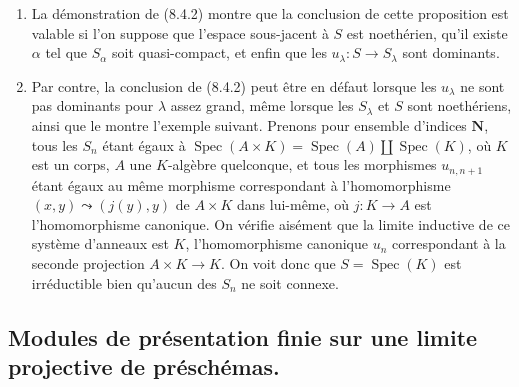 \begin{remarks}[8.4.6]
\label{IV.8.4.6-fr}
\begin{enumerate}[label=(\roman*)]
  \item La démonstration de (8.4.2) montre que la conclusion de cette
  proposition est valable si l'on suppose que l'espace sous-jacent à $S$ est
  noethérien, qu'il existe $\alpha$ tel que $S_\alpha$ soit quasi-compact, et
  enfin que les $u_\lambda:S\to S_\lambda$ sont dominants.

  \item Par contre, la conclusion de (8.4.2) peut être en défaut lorsque les
  $u_\lambda$ ne sont pas dominants pour $\lambda$ assez grand, même lorsque
  les $S_\lambda$ et $S$ sont noethériens, ainsi que le montre l'exemple
  suivant. Prenons pour ensemble d'indices $\mathbf N$, tous les $S_n$ étant
  égaux à
  $\operatorname{Spec}(A\times K)=\operatorname{Spec}(A)\amalg
  \operatorname{Spec}(K)$, où $K$ est un corps, $A$ une $K$-algèbre
  quelconque, et tous les morphismes $u_{n,n+1}$ étant égaux au même morphisme
  correspondant à l'homomorphisme $(x,y)\leadsto(j(y),y)$ de $A\times K$ dans
  lui-même, où $j:K\to A$ est l'homomorphisme canonique. On vérifie aisément
  que la limite inductive de ce système d'anneaux est $K$, l'homomorphisme
  canonique $u_n$ correspondant à la seconde projection $A\times K\to K$. On
  voit donc que $S=\operatorname{Spec}(K)$ est irréductible bien qu'aucun des
  $S_n$ ne soit connexe.
\end{enumerate}
\end{remarks}

\subsection{Modules de présentation finie sur une limite projective de préschémas.}
\label{subsection:IV.8.5-fr}

